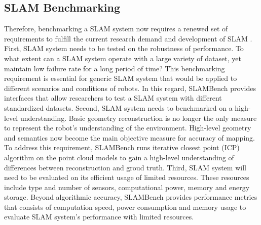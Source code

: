 \subsection{SLAM Benchmarking}
Therefore, benchmarking a SLAM system now requires a renewed set of requirements to fulfill the current research demand and development of SLAM \cite{cadena2016past}.
First, SLAM system needs to be tested on the robustness of performance. To what extent can a SLAM system operate with a large variety of dataset, yet maintain low failure rate for a long period of time? 
This benchmarking requirement is essential for generic SLAM system that would be applied to different scenarios and conditions of robots. 
In this regard, SLAMBench provides interfaces that allow researchers to test a SLAM system with different standardized datasets. 
Second, SLAM system needs to benchmarked on a high-level understanding. 
Basic geometry reconstruction is no longer the only measure to represent the robot’s understanding of the environment. 
High-level geometry and semantics now become the main objective measure for accuracy of mapping. 
To address this requirement, SLAMBench runs iterative closest point (ICP) algorithm on the point cloud models to gain a high-level understanding of differences between reconstruction and groud truth. 
Third, SLAM system will need to be evaluated on its efficient usage of limited resources. 
These resources include type and number of sensors, computational power, memory and energy storage. 
Beyond algorithmic accuracy, SLAMBench provides performance metrics that consists of computation speed, power consumption and memory usage to evaluate SLAM system’s performance with limited resources. 

